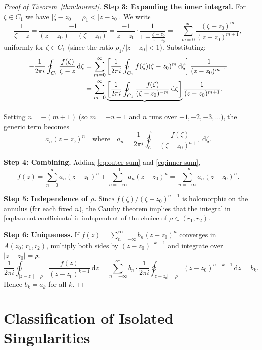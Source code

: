 \documentclass[12pt,a4paper,openany]{book}
\theoremstyle{definition}
\theoremstyle{plain}
\theoremstyle{remark}
\newcommand{\dd}{\mathrm{d}}
\newcommand{\abs}[1]{\left|#1\right|}
\begin{document}
\begin{proof}[Proof of Theorem~\ref{thm:laurent}]
\medskip\noindent
\textbf{Step 3: Expanding the inner integral.}
For $\zeta\in C_1$ we have $\abs{\zeta-z_0}=\rho_1<\abs{z-z_0}$. We write
\[
  \frac{1}{\zeta-z} = \frac{-1}{(z-z_0)-({\zeta-z_0})}
  = \frac{-1}{z-z_0}\cdot\frac{1}{1-\frac{\zeta-z_0}{z-z_0}}
  = -\sum_{m=0}^{\infty}\frac{(\zeta-z_0)^m}{(z-z_0)^{m+1}},
\]
uniformly for $\zeta\in C_1$ (since the ratio $\rho_1/\abs{z-z_0}<1$).
Substituting:
\begin{align}
  -\frac{1}{2\pi i}\oint_{C_1}\frac{f(\zeta)}{\zeta-z}\,\dd\zeta
  &= \sum_{m=0}^{\infty}\left[\frac{1}{2\pi i}\oint_{C_1}
     f(\zeta)(\zeta-z_0)^m\,\dd\zeta\right]\frac{1}{(z-z_0)^{m+1}} \notag\\
  &= \sum_{m=0}^{\infty}\underbrace{\left[\frac{1}{2\pi i}\oint_{C_1}
     \frac{f(\zeta)}{(\zeta-z_0)^{-m}}\,\dd\zeta\right]}_{}\frac{1}{(z-z_0)^{m+1}}. \label{eq:inner-sum}
\end{align}
Setting $n=-(m+1)$ (so $m=-n-1$ and $n$ runs over $-1,-2,-3,\ldots$), the
generic term becomes
\[
  a_n(z-z_0)^n \quad\text{where}\quad
  a_n = \frac{1}{2\pi i}\oint_{C_1}\frac{f(\zeta)}{(\zeta-z_0)^{n+1}}\,\dd\zeta.
\]

\medskip\noindent
\textbf{Step 4: Combining.}
Adding \eqref{eq:outer-sum} and \eqref{eq:inner-sum},
\[
  f(z) = \sum_{n=0}^{\infty}a_n(z-z_0)^n + \sum_{n=-\infty}^{-1}a_n(z-z_0)^n
  = \sum_{n=-\infty}^{+\infty}a_n(z-z_0)^n.
\]

\medskip\noindent
\textbf{Step 5: Independence of $\rho$.}
Since $f(\zeta)/(\zeta-z_0)^{n+1}$ is holomorphic on the annulus (for each fixed $n$),
the Cauchy theorem implies that the integral in \eqref{eq:laurent-coefficients}
is independent of the choice of $\rho\in(r_1,r_2)$.

\medskip\noindent
\textbf{Step 6: Uniqueness.}
If $f(z)=\sum_{n=-\infty}^{\infty}b_n(z-z_0)^n$ converges in $A(z_0;\,r_1,r_2)$,
multiply both sides by $(z-z_0)^{-k-1}$ and integrate over $\abs{z-z_0}=\rho$:
\[
  \frac{1}{2\pi i}\oint_{\abs{z-z_0}=\rho}\frac{f(z)}{(z-z_0)^{k+1}}\,\dd z
  = \sum_{n=-\infty}^{\infty}b_n\cdot\frac{1}{2\pi i}\oint_{\abs{z-z_0}=\rho}
    (z-z_0)^{n-k-1}\,\dd z = b_k.
\]
Hence $b_k=a_k$ for all $k$.
\end{proof}

\section{Classification of Isolated Singularities}
\label{sec:singularities}
\end{document}
